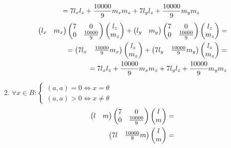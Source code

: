 \begin{enumerate}
{\begin{align*}
          ={7} l_xl_z + {\frac{10000}{9}} m_xm_z + {7} l_yl_z + {\frac{10000}{9}} m_ym_z
        \end{align*}
        \begin{align*}
          \ \begin{pmatrix}l_x & m_x\end{pmatrix}
          {\begin{pmatrix} {7}& 0 \\ 0 & {\frac{10000}{9}}\end{pmatrix}}
          \begin{pmatrix}l_z \\ m_z\end{pmatrix} +
          \begin{pmatrix}l_y & m_y\end{pmatrix}
          {\begin{pmatrix} {7}& 0 \\ 0 & {\frac{10000}{9}}\end{pmatrix}}
          \begin{pmatrix}l_z \\ m_z\end{pmatrix}= \\
          =\begin{pmatrix}{7} l_x & {\frac{10000}{9}} m_x\end{pmatrix}
          \begin{pmatrix}l_z \\ m_z\end{pmatrix} +
          \begin{pmatrix}{7} l_y & {\frac{10000}{9}} m_y\end{pmatrix}
          \begin{pmatrix}l_z \\ m_z\end{pmatrix}= \\
          ={7} l_xl_z + {\frac{10000}{9}} m_xm_z + {7} l_yl_z + {\frac{10000}{9}} m_ym_z
        \end{align*}
        }
  \item {
        $\forall x \in B:\begin{cases}
            (a,a) = 0 \Leftrightarrow x = \theta \\
            (a,a) > 0 \Leftrightarrow x \ne \theta
          \end{cases}$
        \begin{align*}
          \ \begin{pmatrix}l & m\end{pmatrix}
          \mtx
          \begin{pmatrix}l \\ m\end{pmatrix}=                               \\
          \ \begin{pmatrix}\mtxa l & \mtxb m\end{pmatrix}
          \begin{pmatrix}l \\ m\end{pmatrix} =                              \\

\end{align*}}
\end{enumerate}
